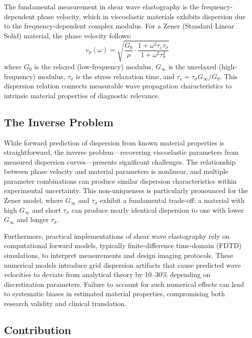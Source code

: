 \documentclass[journal]{IEEEtran}
\begin{document}
The fundamental measurement in shear wave elastography is the frequency-dependent phase velocity, which in viscoelastic materials exhibits dispersion due to the frequency-dependent complex modulus. For a Zener (Standard Linear Solid) material, the phase velocity follows:
\begin{equation}
c_p(\omega) = \sqrt{\frac{G_0}{\rho} \cdot \frac{1 + \omega^2\tau_\varepsilon\tau_\sigma}{1 + \omega^2\tau_\sigma^2}}
\end{equation}
where $G_0$ is the relaxed (low-frequency) modulus, $G_\infty$ is the unrelaxed (high-frequency) modulus, $\tau_\sigma$ is the stress relaxation time, and $\tau_\varepsilon = \tau_\sigma G_\infty/G_0$. This dispersion relation connects measurable wave propagation characteristics to intrinsic material properties of diagnostic relevance.

\subsection{The Inverse Problem}

While forward prediction of dispersion from known material properties is straightforward, the inverse problem---recovering viscoelastic parameters from measured dispersion curves---presents significant challenges. The relationship between phase velocity and material parameters is nonlinear, and multiple parameter combinations can produce similar dispersion characteristics within experimental uncertainty. This non-uniqueness is particularly pronounced for the Zener model, where $G_\infty$ and $\tau_\sigma$ exhibit a fundamental trade-off: a material with high $G_\infty$ and short $\tau_\sigma$ can produce nearly identical dispersion to one with lower $G_\infty$ and longer $\tau_\sigma$.

Furthermore, practical implementations of shear wave elastography rely on computational forward models, typically finite-difference time-domain (FDTD) simulations, to interpret measurements and design imaging protocols. These numerical models introduce grid dispersion artifacts that cause predicted wave velocities to deviate from analytical theory by 10--30\% depending on discretization parameters. Failure to account for such numerical effects can lead to systematic biases in estimated material properties, compromising both research validity and clinical translation.

\subsection{Contribution}
\end{document}
